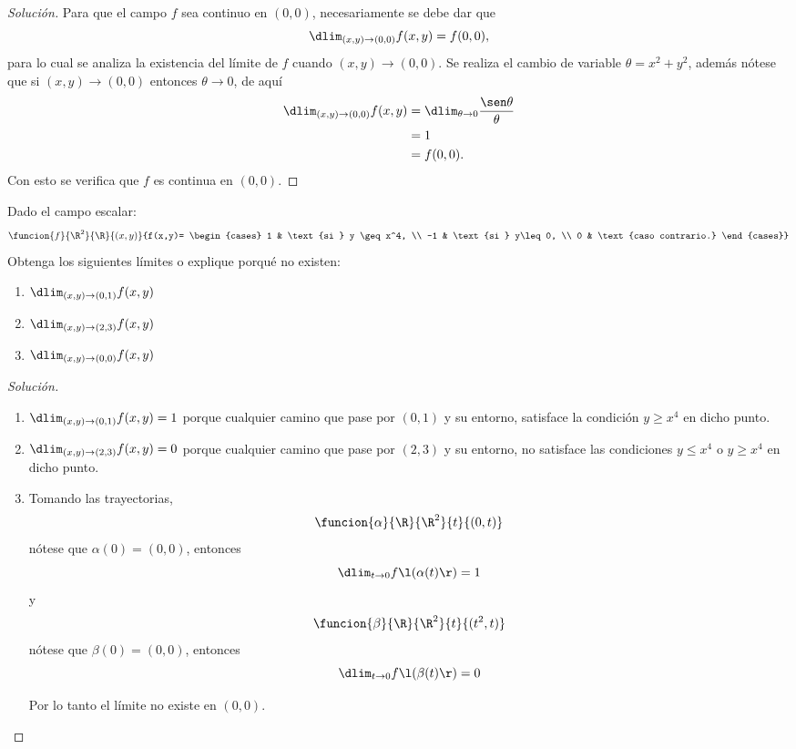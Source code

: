 \documentclass[a4,11pt]{aleph-notas}
\begin{document}
\begin{proof}[Solución]
Para que el campo $f$ sea continuo en $(0,0)$, necesariamente se debe dar que
    \[
        \dlim_{(x,y)\to (0,0)}f(x,y)=f(0,0),
    \]
    para lo cual se analiza la existencia del límite de $f$ cuando $(x,y)\to (0,0)$. Se realiza el cambio de variable $\theta=x^2+y^2$, además nótese que si $(x,y)\to (0,0)$ entonces $\theta \to 0$, de aquí
    \begin{align*}
        \dlim_{(x,y)\to (0,0)}f(x,y)&=\dlim_{\theta\to 0}\dfrac{\sen \theta}{\theta}\\
        &=1\\
        &=f(0,0).
    \end{align*}
    Con esto se verifica que $f$ es continua en $(0,0)$.
\end{proof}

\begin{ejer}
Dado el campo escalar:
    \[
        \funcion{f}{\R^2}{\R}{(x,y)}{f(x,y)=
    \begin{cases}
         1 & \text{si } y \geq x^4, \\
         -1 & \text{si } y\leq0, \\
         0 & \text{caso contrario.}
    \end{cases}}
    \]
    Obtenga los siguientes límites o explique porqué no existen:
    \begin{enumerate}
        \item $\dlim_{(x,y) \to (0,1)} f(x,y)$
        \item $\dlim_{(x,y) \to (2,3)} f(x,y)$
        \item $\dlim_{(x,y) \to (0,0)} f(x,y)$
    \end{enumerate}
\end{ejer}

\begin{proof}[Solución]
\begin{enumerate}
            \item $\dlim_{(x,y) \to (0,1)} f(x,y)=1$ porque cualquier camino que pase por $(0,1)$ y su entorno, satisface la condición $y \geq x^4$ en dicho punto.
            \item $\dlim_{(x,y) \to (2,3)} f(x,y)=0$ porque cualquier camino que pase por $(2,3)$ y su entorno, no satisface las condiciones $y \leq x^4$ o $y \geq x^4$ en dicho punto.
            \item Tomando las trayectorias,
                \[
                    \funcion{\alpha}{\R}{\R^2}{t}{(0,t)}
                \]
                nótese que $\alpha(0)=(0,0)$, entonces
                \[
                    \dlim_{t \to 0} f\l(\alpha(t)\r)=1
                \]
                y
                \[
                    \funcion{\beta}{\R}{\R^2}{t}{(t^2,t)}
                \]
                nótese que $\beta(0)=(0,0)$, entonces
                \[
                    \dlim_{t \to 0} f\l(\beta(t)\r)=0
                \]
                
                Por lo tanto el límite no existe en $(0,0)$.
\end{enumerate}
\end{proof}
\end{document}
